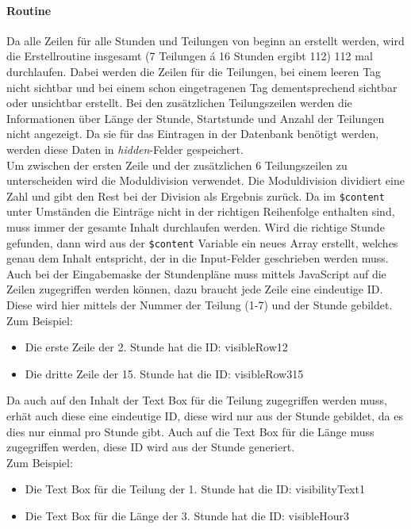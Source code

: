 \paragraph{Routine\\}
Da alle Zeilen für alle Stunden und Teilungen von beginn an erstellt werden, wird die Erstellroutine insgesamt (7 Teilungen \'{a} 16 Stunden ergibt 112) 112 mal durchlaufen. Dabei werden die Zeilen für die Teilungen, bei einem leeren Tag nicht sichtbar und bei einem schon eingetragenen Tag dementsprechend sichtbar oder unsichtbar erstellt. Bei den zusätzlichen Teilungszeilen werden die Informationen über Länge der Stunde, Startstunde und Anzahl der Teilungen nicht angezeigt. Da sie für das Eintragen in der Datenbank benötigt werden, werden diese Daten in \textit{hidden}-Felder gespeichert.\\
Um zwischen der ersten Zeile und der zusätzlichen 6 Teilungszeilen zu unterscheiden wird die Moduldivision verwendet. Die Moduldivision dividiert eine Zahl und gibt den Rest bei der Division als Ergebnis zurück. Da im \texttt{\$content} unter Umständen die Einträge nicht in der richtigen Reihenfolge enthalten sind, muss immer der gesamte Inhalt durchlaufen werden. Wird die richtige Stunde gefunden, dann wird aus der \texttt{\$content} Variable ein neues Array erstellt, welches genau dem Inhalt entspricht, der in die Input-Felder geschrieben werden muss.\\
Auch bei der Eingabemaske der Stundenpläne muss mittels JavaScript auf die Zeilen zugegriffen werden können, dazu braucht jede Zeile eine eindeutige ID. Diese wird hier mittels der Nummer der Teilung (1-7) und der Stunde gebildet.\\ 
Zum Beispiel:
\begin{itemize}
	\item Die erste Zeile der 2. Stunde hat die ID: visibleRow12
	\item Die dritte Zeile der 15. Stunde hat die ID: visibleRow315
\end{itemize}
Da auch auf den Inhalt der Text Box für die Teilung zugegriffen werden muss, erhät auch diese eine eindeutige ID, diese wird nur aus der Stunde gebildet, da es dies nur einmal pro Stunde gibt. Auch auf die Text Box für die Länge muss zugegriffen werden, diese ID wird aus der Stunde generiert.\\
Zum Beispiel:
\begin{itemize}
	\item Die Text Box für die Teilung der 1. Stunde hat die ID: visibilityText1
	\item Die Text Box für die Länge der 3. Stunde hat die ID: visibleHour3
\end{itemize}
